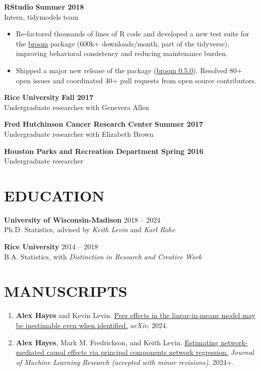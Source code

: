\documentclass[11pt]{article}
\newcommand{\underlinedlink}[2]{\href{#1}{\ul{#2}}}
\begin{document}
{\large \textbf{RStudio}} \hfill \textbf{Summer 2018}\\
Intern, tidymodels team
\begin{itemize}
    \item Re-factored thousands of lines of R code and developed a new test suite for the \underlinedlink{https://github.com/tidymodels/broom}{broom} package (600k+ downloads/month, part of the tidyverse), improving behavioral consistency and reducing maintenance burden.
    \item Shipped a major new release of the package (\underlinedlink{https://www.tidyverse.org/blog/2018/07/broom-0-5-0/}{broom 0.5.0}). Resolved 80+ open issues and coordinated 40+ pull requests from open source contributors.
\end{itemize}

{\large \textbf{Rice University}} \hfill \textbf{Fall 2017}\\
Undergraduate researcher with Genevera Allen

    {\large \textbf{Fred Hutchinson Cancer Research Center}} \hfill \textbf{Summer 2017}\\
Undergraduate researcher with Elizabeth Brown

    {\large \textbf{Houston Parks and Recreation Department}} \hfill \textbf{Spring 2016}\\
Undergraduate researcher

\section*{EDUCATION}

\textbf{University of Wisconsin-Madison} \hfill 2018 -- 2024\\
Ph.D. Statistics, advised by \emph{Keith Levin} and \emph{Karl Rohe}

\textbf{Rice University} \hfill 2014 -- 2018\\
B.A. Statistics, with \emph{Distinction in Research and Creative Work}


\section*{MANUSCRIPTS}

\begin{enumerate}
    \item \textbf{Alex Hayes} and Kevin Levin. \underlinedlink{https://arxiv.org/abs/2410.10772}{Peer effects in the linear-in-means model may be inestimable even when identified.} \emph{arXiv}. 2024.
    \item \textbf{Alex Hayes}, Mark M. Fredrickson, and Keith Levin. \underlinedlink{http://arxiv.org/abs/2212.12041}{Estimating network-mediated causal effects via principal components network regression.} \emph{Journal of Machine Learning Research (accepted with minor revisions)}. 2024+.
\end{enumerate}
\end{document}
